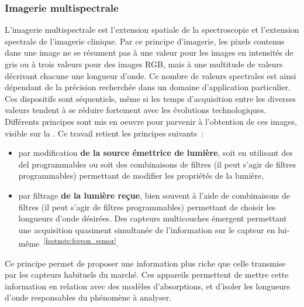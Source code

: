 \addtocounter{footnote}{1}

\subsubsection{Imagerie multispectrale}
L'imagerie multispectrale est l'extension spatiale de la spectroscopie et l'extension spectrale de l'imagerie clinique. Par ce principe d'imagerie, les pixels contenus dans une image ne se résument pas à une valeur pour les images en intensités de gris ou à trois valeurs pour des images RGB, mais à une multitude de valeurs décrivant chacune une longueur d'onde. Ce nombre de valeurs spectrales est ainsi dépendant de la précision recherchée dans un domaine d'application particulier. Ces dispositifs sont séquentiels, même si les temps d'acquisition entre les diverses valeurs tendent à se réduire fortement avec les évolutions technologiques. Différents principes sont mis en oeuvre pour parvenir à l'obtention de ces images, visible sur la . Ce travail retient les principes suivants~:
\begin{itemize}
    \item par modification \textbf{de la source émettrice de lumière}, soit en utilisant des \gls{del} programmables ou soit des combinaisons de filtres (il peut s'agir de filtres programmables) permettant de modifier les propriétés de la lumière,
    \item par filtrage \textbf{de la lumière reçue}, bien souvent à l'aide de combinaisons de filtres (il peut s'agir de filtres programmables) permettant de choisir les longueurs d'onde désirées. Des capteurs multicouches émergent permettant une acquisition quasiment simultanée de l'information sur le capteur en lui-même~\textsuperscript{\ref{footnote:foveon_sensor}}.
\end{itemize}\par

Ce principe permet de proposer une information plus riche que celle transmise par les capteurs habituels du marché. Ces appareils permettent de mettre cette information en relation avec des modèles d'absorptions, et d'isoler les longueurs d'onde responsables du phénomène à analyser.\par 

\addtocounter{footnote}{1}

